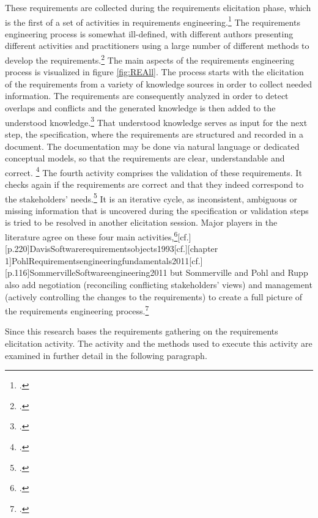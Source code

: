 These requirements are collected during the requirements elicitation phase, which is the first of a set of activities in requirements engineering.\footcites[Cf.][p.116]{SommervilleSoftwareengineering2011}[cf.][p.17]{SommervilleIntegratedrequirementsengineering2005} The requirements engineering process is somewhat ill-defined, with different authors presenting different activities and practitioners using a large number of different methods to develop the requirements.\footcite[Cf.][p.225]{ZhangEffectiverequirementsdevelopmentA2007} The main aspects of the requirements engineering process is visualized in figure \ref{fig:REAll}. The process starts with the elicitation of the requirements from a variety of knowledge sources in order to collect needed information. The requirements are consequently analyzed in order to detect overlaps and conflicts and the generated knowledge is then added to the understood knowledge.\footcite[Cf.][p.17]{SommervilleIntegratedrequirementsengineering2005} That understood knowledge serves as input for the next step, the specification, where the requirements are structured and recorded in a document. The documentation may be done via natural language or dedicated conceptual models, so that the requirements are clear, understandable and correct. \footcite[Cf.][chapter 1]{PohlRequirementsengineeringfundamentals2011} The fourth activity comprises the validation of these requirements. It checks again if the requirements are correct and that they indeed correspond to the stakeholders' needs.\footcite[Cf.][p.17]{SommervilleIntegratedrequirementsengineering2005}
It is an iterative cycle, as inconsistent, ambiguous or missing information that is uncovered during the specification or validation steps is tried to be resolved in another elicitation session. 
Major players in the literature agree on these four main activities,\footcite[Cf.][p.225]{ZhangEffectiverequirementsdevelopmentA2007}[cf.][p.220]{DavisSoftwarerequirementsobjects1993}[cf.][chapter 1]{PohlRequirementsengineeringfundamentals2011}[cf.][p.116]{SommervilleSoftwareengineering2011} but Sommerville and Pohl and Rupp also add negotiation (reconciling conflicting stakeholders' views) and management (actively controlling the changes to the requirements) to create a full picture of the requirements engineering process.\footcites[Cf.][p.17]{SommervilleSoftwareengineering2011}[cf.][chapter 1]{PohlRequirementsengineeringfundamentals2011}


Since this research bases the requirements gathering on the requirements elicitation activity. The activity and the methods used to execute this activity are examined in further detail in the following paragraph. 

